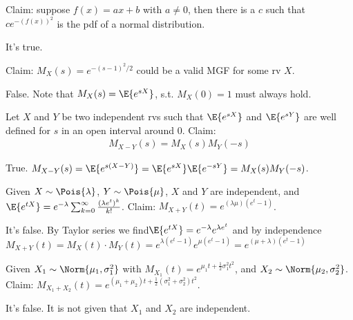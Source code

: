 \documentclass[tf-tutorial-all.tex]{subfiles}
\begin{document}
\begin{truefalse}
Claim: suppose $f(x) = a x + b$ with $a\neq 0$, then there is a $c$ such that $c e^{-(f(x))^2}$ is the pdf of a normal distribution.
\begin{solution}
It's true.
\end{solution}
\end{truefalse}


\begin{truefalse}
Claim: $M_X(s)=e^{-(s-1)^2/2}$ could be a valid MGF for some rv $X$.
\begin{solution}
False. Note that $M_X(s)=\E{e^{sX}}$, s.t. $M_X(0)=1$ must always hold.
\end{solution}
\end{truefalse}


\begin{truefalse}
Let $X$ and $Y$ be two independent rvs such that $\E{e^{s X}}$ and $\E{e^{s Y}}$ are well defined for $s$ in an open interval around $0$.
Claim:
\begin{align}
\label{eq:2}
M_{X-Y}(s)=M_X(s)M_Y(-s)
\end{align}
\begin{solution}
True. $M_{X-Y}(s)=\E{e^{s(X-Y)}}=\E{e^{sX}}\E{e^{-sY}}=M_X(s)M_Y(-s)$.
\end{solution}
\end{truefalse}

\begin{truefalse}
Given $X\sim \Pois{\lambda}$, $Y \sim \Pois{\mu}$, $X$ and $Y$ are independent, and $\E{e^{tX}} = e^{-\lambda}\sum^{\infty}_{k=0} \frac{(\lambda e^t)^k}{k!}$.
Claim: $M_{X+Y}(t) = e^{(\lambda \mu)(e^t-1)}$.
\begin{solution}
It's false. By Taylor series we find$ \E{e^{tX}} = e^{-\lambda} e^{\lambda e^t}$ and by independence $M_{X+Y}(t) = M_X(t) \cdot M_Y(t) = e^{\lambda(e^t-1)} e^{\mu(e^t-1)} = e^{(\mu + \lambda)(e^t-1)}$
\end{solution}
\end{truefalse}


\begin{truefalse}
Given $X_1\sim \Norm{\mu_1, \sigma_1^2}$ with $M_{X_1}(t) = e^{\mu_1t + \frac{1}{2}\sigma_1^2t^2}$, and $X_2\sim \Norm{\mu_2, \sigma_2^2}$.
Claim: $M_{X_1+X_2}(t) = e^{(\mu_1 + \mu_2)t +\frac{1}{2}(\sigma_1^2 + \sigma_2^2)t^2}$.
\begin{solution}
It's false. It is not given that $X_1$ and $X_2$ are independent.
\end{solution}
\end{truefalse}
\end{document}
